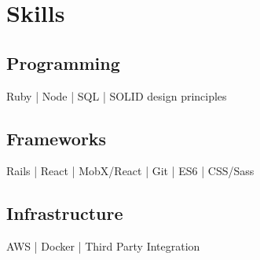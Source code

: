 \section{Skills}
  \subsection{Programming}
  Ruby | Node | SQL | SOLID design principles \\
  \subsection{Frameworks}
  Rails | React | MobX/React | Git | ES6 | CSS/Sass \\
  \subsection{Infrastructure}
  AWS | Docker | Third Party Integration \\
